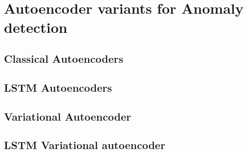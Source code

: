 \section{Autoencoder variants for Anomaly detection}

\subsection{Classical Autoencoders}
\subsection{LSTM Autoencoders}
\subsection{Variational Autoencoder}
\subsection{LSTM Variational autoencoder}
